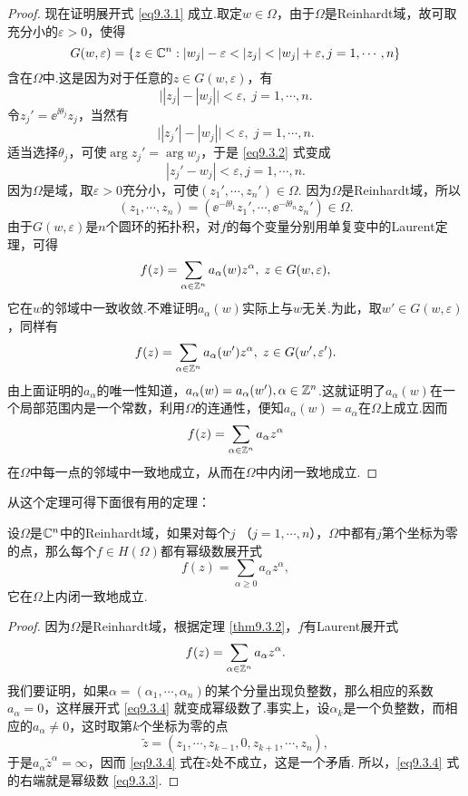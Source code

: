 \begin{proof}
现在证明展开式 \eqref{eq9.3.1} 成立.取定$w\in\Omega$，由于$\Omega$是Reinhardt域，故可取充分小的$\varepsilon>0$，使得
\[G(w,\varepsilon)=\{z\in\MC^n:|w_j|-\varepsilon<|z_j|<|w_j|+\varepsilon,j=1,\cdots,n\}\]
含在$\Omega$中.这是因为对于任意的$z\in G(w,\varepsilon)$，有
\[\big||z_j|-|w_j|\big|<\varepsilon,\;j=1,\cdots,n.\]
令$z_j'=\ee^{\ii\theta_j}z_j$，当然有
\begin{equation}\label{eq9.3.2}
\big||z_j'|-|w_j|\big|<\varepsilon,\;j=1,\cdots,n.
\end{equation}
适当选择$\theta_j$，可使$\arg z_j'=\arg w_j$，于是 \eqref{eq9.3.2} 式变成
\[|z_j'-w_j|<\varepsilon,j=1,\cdots,n.\]
因为$\Omega$是域，取$\varepsilon>0$充分小，可使$(z_1',\cdots,z_n')\in\Omega$. 因为$\Omega$是Reinhardt域，所以
\[(z_1,\cdots,z_n)=(\ee^{-\ii\theta_1}z_1',\cdots,\ee^{-\ii\theta_n}z_n')\in\Omega.\]
由于$G(w,\varepsilon)$是$n$个圆环的拓扑积，对$f$的每个变量分别用单复变中的Laurent定理，可得
\[f(z)=\sum_{\alpha\in\mathbb Z^n}a_\alpha(w)z^\alpha,\;z\in G(w,\varepsilon),\]
它在$w$的邻域中一致收敛.不难证明$a_\alpha(w)$实际上与$w$无关.为此，取$w'\in G(w,\varepsilon)$，同样有
\[f(z)=\sum_{\alpha\in\mathbb Z^n}a_\alpha(w')z^\alpha,\;z\in G(w',\varepsilon').\]
由上面证明的$a_\alpha$的唯一性知道，$a_\alpha(w)=a_\alpha(w'),\alpha\in\mathbb Z^n $.这就证明了$a_\alpha(w)$在一个局部范围内是一个常数，利用$\Omega$的连通性，便知$a_\alpha(w)=a_\alpha$在$\Omega$上成立.因而
\[f(z)=\sum_{\alpha\in\mathbb Z^n}a_\alpha z^\alpha\]
在$\Omega$中每一点的邻域中一致地成立，从而在$\Omega$中内闭一致地成立.
\end{proof}

从这个定理可得下面很有用的定理：
\begin{theorem}\label{thm9.3.3}
设$\Omega$是$\mathbb C^n$中的Reinhardt域，如果对每个$j$
（$j=1,\cdots,n$），$\Omega$中都有$j$第个坐标为零的点，那么每个$f\in H(\Omega)$都有幂级数展开式
\begin{equation}\label{eq9.3.3}
f(z)=\sum_{\alpha\ge0}a_\alpha z^\alpha,
\end{equation}
它在$\Omega$上内闭一致地成立.
\end{theorem}
\begin{proof}
因为$\Omega$是Reinhardt域，根据定理 \ref{thm9.3.2}，$f$有Laurent展开式
\begin{equation}\label{eq9.3.4}
f(z)=\sum_{\alpha\in\mathbb Z^n}a_\alpha z^\alpha.
\end{equation}
我们要证明，如果$\alpha=(\alpha_1,\cdots,\alpha_n)$的某个分量出现负整数，那么相应的系数$a_\alpha=0$，这样展开式 \eqref{eq9.3.4} 就变成幂级数了.事实上，设$\alpha_k$是一个负整数，而相应的$a_\alpha\ne0$，这时取第$k$个坐标为零的点
\[\tilde{z}=(z_1,\cdots,z_{k-1},0,z_{k+1},\cdots,z_n),\]
于是$a_\alpha\tilde{z}^\alpha=\infty$，因而 \eqref{eq9.3.4} 式在$\tilde{z}$处不成立，这是一个矛盾. 所以，\eqref{eq9.3.4} 式的右端就是幂级数 \eqref{eq9.3.3}.
\end{proof}

